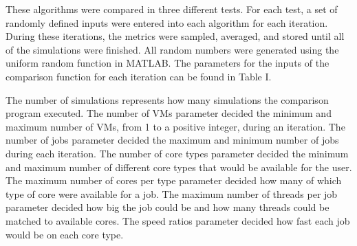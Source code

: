 \documentclass[conference]{IEEEtran}
\begin{document}
\begin{table}[h]
     \newline
     \caption{Comparison III}
     \label{compIII}
\end{table}

These algorithms were compared in three different tests.  
For each test, 
a set of randomly defined inputs were entered into each algorithm 
for each iteration.  
During these iterations, the metrics were sampled, 
averaged, and stored until all of the simulations were finished.  
All random
numbers were generated using the uniform random function in MATLAB.  
The parameters for the inputs of the comparison function for each 
iteration can be found in Table I.

The number of simulations represents how many simulations the comparison 
program executed.  The number of VMs parameter decided the minimum 
and maximum number of VMs, from 1 to a positive integer, during an iteration.  
The number of jobs parameter decided the maximum and minimum number 
of jobs during each iteration.  The number of core types parameter decided 
the minimum and maximum number of different core types that would be 
available for the user.  The maximum number of cores per type parameter 
decided how many of which type of core were available for a job.  
The maximum number of threads per job parameter decided how big the
 job could be and how many threads could be matched to available cores.  
The speed ratios parameter decided how fast each job would be on each core type.
\end{document}
